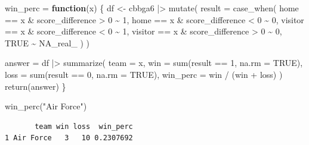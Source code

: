 \documentclass[
  letterpaper,
  DIV=11,
  numbers=noendperiod]{scrartcl}
\newenvironment{Shaded}{\begin{snugshade}}{\end{snugshade}}
\newcommand{\AttributeTok}[1]{\textcolor[rgb]{0.40,0.45,0.13}{#1}}
\newcommand{\ConstantTok}[1]{\textcolor[rgb]{0.56,0.35,0.01}{#1}}
\newcommand{\ControlFlowTok}[1]{\textcolor[rgb]{0.00,0.23,0.31}{\textbf{#1}}}
\newcommand{\DecValTok}[1]{\textcolor[rgb]{0.68,0.00,0.00}{#1}}
\newcommand{\FunctionTok}[1]{\textcolor[rgb]{0.28,0.35,0.67}{#1}}
\newcommand{\NormalTok}[1]{\textcolor[rgb]{0.00,0.23,0.31}{#1}}
\newcommand{\OtherTok}[1]{\textcolor[rgb]{0.00,0.23,0.31}{#1}}
\newcommand{\SpecialCharTok}[1]{\textcolor[rgb]{0.37,0.37,0.37}{#1}}
\newcommand{\StringTok}[1]{\textcolor[rgb]{0.13,0.47,0.30}{#1}}
\begin{document}
\begin{Shaded}
\begin{Highlighting}[]
\NormalTok{win\_perc }\OtherTok{=} \ControlFlowTok{function}\NormalTok{(x) \{}
\NormalTok{  df }\OtherTok{\textless{}{-}}\NormalTok{ cbbga6 }\SpecialCharTok{|\textgreater{}}
  \FunctionTok{mutate}\NormalTok{(}
      \AttributeTok{result =} \FunctionTok{case\_when}\NormalTok{(}
\NormalTok{      home }\SpecialCharTok{==}\NormalTok{ x }\SpecialCharTok{\&}\NormalTok{ score\_difference }\SpecialCharTok{\textgreater{}} \DecValTok{0} \SpecialCharTok{\textasciitilde{}} \DecValTok{1}\NormalTok{,}
\NormalTok{      home }\SpecialCharTok{==}\NormalTok{ x }\SpecialCharTok{\&}\NormalTok{ score\_difference }\SpecialCharTok{\textless{}} \DecValTok{0} \SpecialCharTok{\textasciitilde{}} \DecValTok{0}\NormalTok{,}
\NormalTok{      visitor }\SpecialCharTok{==}\NormalTok{ x }\SpecialCharTok{\&}\NormalTok{ score\_difference }\SpecialCharTok{\textless{}} \DecValTok{0} \SpecialCharTok{\textasciitilde{}} \DecValTok{1}\NormalTok{,}
\NormalTok{      visitor }\SpecialCharTok{==}\NormalTok{ x }\SpecialCharTok{\&}\NormalTok{ score\_difference }\SpecialCharTok{\textgreater{}} \DecValTok{0} \SpecialCharTok{\textasciitilde{}} \DecValTok{0}\NormalTok{,}
      \ConstantTok{TRUE} \SpecialCharTok{\textasciitilde{}} \ConstantTok{NA\_real\_}
\NormalTok{    )}
\NormalTok{  )}

\NormalTok{answer }\OtherTok{=}\NormalTok{ df }\SpecialCharTok{|\textgreater{}}
  \FunctionTok{summarize}\NormalTok{(}
    \AttributeTok{team =}\NormalTok{ x,}
    \AttributeTok{win =} \FunctionTok{sum}\NormalTok{(result }\SpecialCharTok{==} \DecValTok{1}\NormalTok{, }\AttributeTok{na.rm =} \ConstantTok{TRUE}\NormalTok{),}
    \AttributeTok{loss =} \FunctionTok{sum}\NormalTok{(result }\SpecialCharTok{==} \DecValTok{0}\NormalTok{, }\AttributeTok{na.rm =} \ConstantTok{TRUE}\NormalTok{),}
    \AttributeTok{win\_perc =}\NormalTok{ win }\SpecialCharTok{/}\NormalTok{ (win }\SpecialCharTok{+}\NormalTok{ loss)}
\NormalTok{  )}
\FunctionTok{return}\NormalTok{(answer)}
\NormalTok{\}}

\FunctionTok{win\_perc}\NormalTok{(}\StringTok{"Air Force"}\NormalTok{)}
\end{Highlighting}
\end{Shaded}

\begin{verbatim}
       team win loss  win_perc
1 Air Force   3   10 0.2307692
\end{verbatim}
\end{document}
